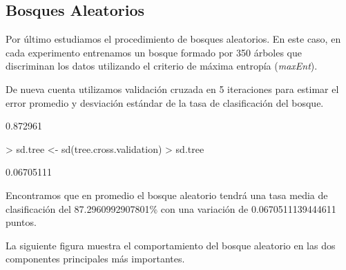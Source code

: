 \documentclass[a4paper, 10pt]{article}
\begin{document}
\subsection{Bosques Aleatorios}
Por último estudiamos el procedimiento de bosques aleatorios. En este caso, en cada experimento entrenamos un bosque formado por 350 árboles que discriminan los datos utilizando el criterio de máxima entropía (\emph{maxEnt}).

De nueva cuenta utilizamos validación cruzada en 5 iteraciones para estimar el error promedio y desviación estándar de la tasa de clasificación del bosque.

\begin{Schunk}
\begin{Soutput}
[1] 0.872961
\end{Soutput}
\begin{Sinput}
> sd.tree <- sd(tree.cross.validation)
> sd.tree
\end{Sinput}
\begin{Soutput}
[1] 0.06705111
\end{Soutput}
\end{Schunk}

Encontramos que en promedio el bosque aleatorio tendrá una tasa media de clasificación del 87.2960992907801\% con una variación de 0.0670511139444611 puntos.

La siguiente figura muestra el comportamiento del bosque aleatorio en las dos componentes principales más importantes.
\end{document}
